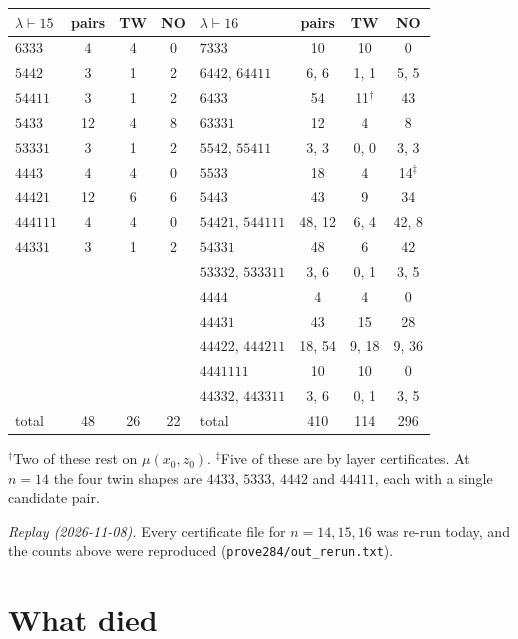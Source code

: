 \documentclass[11pt]{amsart}
\theoremstyle{plain}
\theoremstyle{definition}
\begin{document}
{\footnotesize
\begin{center}
\begin{tabular}{@{}lccc@{\qquad}lccc@{}}\toprule
$\lambda\vdash15$ & pairs & TW & NO & $\lambda\vdash16$ & pairs & TW & NO\\\midrule
$6333$ & 4 & 4 & 0 & $7333$ & 10 & 10 & 0\\
$5442$ & 3 & 1 & 2 & $6442$, $64411$ & 6, 6 & 1, 1 & 5, 5\\
$54411$ & 3 & 1 & 2 & $6433$ & 54 & 11$^\dagger$ & 43\\
$5433$ & 12 & 4 & 8 & $63331$ & 12 & 4 & 8\\
$53331$ & 3 & 1 & 2 & $5542$, $55411$ & 3, 3 & 0, 0 & 3, 3\\
$4443$ & 4 & 4 & 0 & $5533$ & 18 & 4 & 14$^\ddagger$\\
$44421$ & 12 & 6 & 6 & $5443$ & 43 & 9 & 34\\
$444111$ & 4 & 4 & 0 & $54421$, $544111$ & 48, 12 & 6, 4 & 42, 8\\
$44331$ & 3 & 1 & 2 & $54331$ & 48 & 6 & 42\\
 & & & & $53332$, $533311$ & 3, 6 & 0, 1 & 3, 5\\
 & & & & $4444$ & 4 & 4 & 0\\
 & & & & $44431$ & 43 & 15 & 28\\
 & & & & $44422$, $444211$ & 18, 54 & 9, 18 & 9, 36\\
 & & & & $4441111$ & 10 & 10 & 0\\
 & & & & $44332$, $443311$ & 3, 6 & 0, 1 & 3, 5\\\midrule
total & 48 & 26 & 22 & total & 410 & 114 & 296\\\bottomrule
\end{tabular}
\end{center}
$^\dagger$Two of these rest on $\mu(x_0,z_0)$. \quad $^\ddagger$Five of these are by layer certificates. At $n=14$ the four twin shapes are $4433$, $5333$, $4442$ and $44411$, each with a single candidate pair.}

\medskip
\noindent\emph{Replay (2026-11-08).} Every certificate file for $n=14,15,16$ was re-run today, and the counts above were reproduced (\texttt{prove284/out\_rerun.txt}).

\section{What died}
\end{document}

